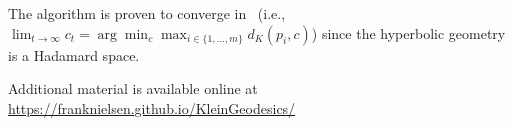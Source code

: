 \documentclass[11pt]{article}
\begin{document}
The algorithm is proven to converge in~\cite{ArnaudonNielsen-2012} (i.e., $\lim_{t\rightarrow\infty} c_t=\arg \min_c \max_{i\in\{1,\ldots,m\}} d_K(p_i,c)$) since the hyperbolic geometry is a Hadamard space. 

\vskip 0.5cm
\noindent Additional material is available online at \url{https://franknielsen.github.io/KleinGeodesics/}



\end{document}
